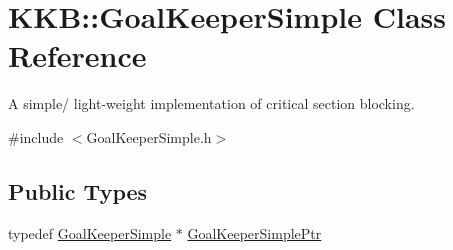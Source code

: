 \hypertarget{class_k_k_b_1_1_goal_keeper_simple}{}\section{K\+KB\+:\+:Goal\+Keeper\+Simple Class Reference}
\label{class_k_k_b_1_1_goal_keeper_simple}


A simple/ light-\/weight implementation of critical section blocking.  




{\ttfamily \#include $<$Goal\+Keeper\+Simple.\+h$>$}

\subsection*{Public Types}
\begin{DoxyCompactItemize}
\item 
typedef \hyperlink{class_k_k_b_1_1_goal_keeper_simple}{Goal\+Keeper\+Simple} $\ast$ \hyperlink{class_k_k_b_1_1_goal_keeper_simple_a5e73be577d62a04e6980bb94027f653b}{Goal\+Keeper\+Simple\+Ptr}
\end{DoxyCompactItemize}
